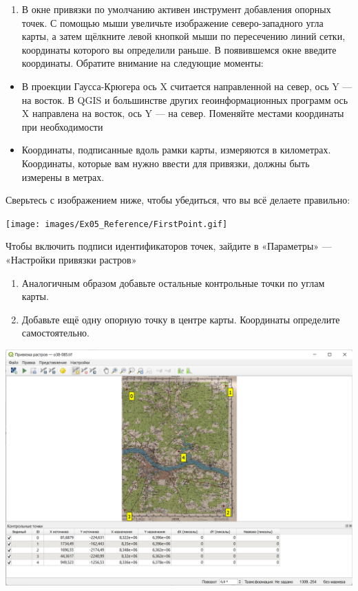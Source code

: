 \documentclass[
  12pt,
]{book}
\providecommand{\tightlist}{%
  \setlength{\itemsep}{0pt}\setlength{\parskip}{0pt}}
\begin{document}
\begin{enumerate}
\def\labelenumi{\arabic{enumi}.}
\setcounter{enumi}{6}
\tightlist
\item
  В окне привязки по умолчанию активен инструмент добавления опорных точек. С помощью мыши увеличьте изображение северо-западного угла карты, а затем щёлкните левой кнопкой мыши по пересечению линий сетки, координаты которого вы определили раньше. В появившемся окне введите координаты. Обратите внимание на следующие моменты:
\end{enumerate}

\begin{itemize}
\tightlist
\item
  В проекции Гаусса-Крюгера ось X считается направленной на север, ось Y --- на восток. В QGIS и большинстве других геоинформационных программ ось X направлена на восток, ось Y --- на север. Поменяйте местами координаты при необходимости
\item
  Координаты, подписанные вдоль рамки карты, измеряются в километрах. Координаты, которые вам нужно ввести для привязки, должны быть измерены в метрах.
\end{itemize}

Сверьтесь с изображением ниже, чтобы убедиться, что вы всё делаете правильно:

\texttt{[image: images/Ex05\_Reference/FirstPoint.gif]}

Чтобы включить подписи идентификаторов точек, зайдите в «Параметры» --- «Настройки привязки растров»

\begin{enumerate}
\def\labelenumi{\arabic{enumi}.}
\setcounter{enumi}{7}
\item
  Аналогичным образом добавьте остальные контрольные точки по углам карты.
\item
  Добавьте ещё одну опорную точку в центре карты. Координаты определите самостоятельно.
\end{enumerate}

\includegraphics{images/Ex05_Reference/RasterReference2.png}
\end{document}
